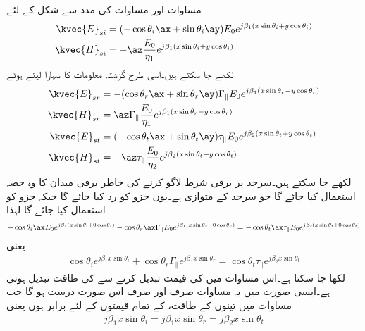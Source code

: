 مساوات  اور مساوات  کی مدد سے شکل  کے لئے
\begin{align}
\kvec{E}_{si}&=(-\cos \theta_i \ax+\sin \theta_i \ay)E_0  e^{j\beta_1 (x\sin \theta_i +y \cos \theta_i)}\\ 
\kvec{H}_{si}&=-\az \frac{E_0}{\eta_1} e^{j\beta_1 (x\sin \theta_i +y \cos \theta_i)}
\end{align}
لکھے جا سکتے ہیں۔اسی طرح گزشتہ معلومات کا سہارا لیتے ہوئے
\begin{align}
\kvec{E}_{sr}&= -(\cos \theta_r \ax+\sin \theta_r \ay)\Gamma_{\parallel} E_0 e^{ j \beta_1 (x \sin \theta_r-y\cos \theta_r)}\\
\kvec{H}_{sr}&=\az\Gamma_{\parallel} \frac{ E_0}{\eta_1} e^{j \beta_1 (x \sin \theta_r-y\cos \theta_r)}\\
\kvec{E}_{st} &= (-\cos \theta_t \ax+\sin \theta_t \ay )\tau_{\parallel} E_0 e^{j \beta_2 (x \sin \theta_t+y\cos \theta_t)}\\
\kvec{H}_{st} &=-\az \tau_{\parallel} \frac{E_0}{\eta_2} e^{j \beta_2 (x \sin \theta_t+y\cos \theta_t)} 
\end{align}
لکھے جا سکتے ہیں۔سرحد  پر برقی شرط لاگو کرنے کی خاطر برقی میدان کا وہ حصہ استعمال کیا جائے گا جو سرحد کے متوازی ہے۔یوں  جزو کو رد کیا جائے گا جبکہ  جزو کو استعمال کیا جائے گا لہٰذا
\begin{align*}
-\cos \theta_i \ax E_0  e^{j\beta_1 (x\sin \theta_i +0 \cos \theta_i)}- \cos \theta_r \ax\Gamma_{\parallel} E_0 e^{ j \beta_1 (x \sin \theta_r-0\cos \theta_r)}=-\cos \theta_t \ax\tau_{\parallel} E_0 e^{j \beta_2 (x \sin \theta_t+0\cos \theta_t)}
\end{align*}
یعنی
\begin{align}\label{مساوات_ترچھی_متوازی_قطبی_موج_برقی_شرط}
\cos \theta_i    e^{j\beta_1 x\sin \theta_i}+ \cos \theta_r \Gamma_{\parallel}  e^{ j \beta_1 x \sin \theta_r}=\cos \theta_t \tau_{\parallel}  e^{j \beta_2 x \sin \theta_t}
\end{align}
لکھا جا سکتا ہے۔اس مساوات میں  کی قیمت تبدیل کرنے سے  کی طاقت تبدیل ہوتی ہے۔ایسی صورت میں یہ مساوات صرف اور صرف اس صورت درست ہو گا جب مساوات میں تینوں  کے طاقت،  کے تمام قیمتوں کے لئے برابر ہوں یعنی
\begin{align}\label{مساوات_ترچھی_متوازی_قطبی_موج_برقی_شرط_پہلا_نتیجہ}
j \beta_1 x\sin \theta_i=j \beta_1 x \sin \theta_r=j \beta_2 x \sin \theta_t
\end{align} 
